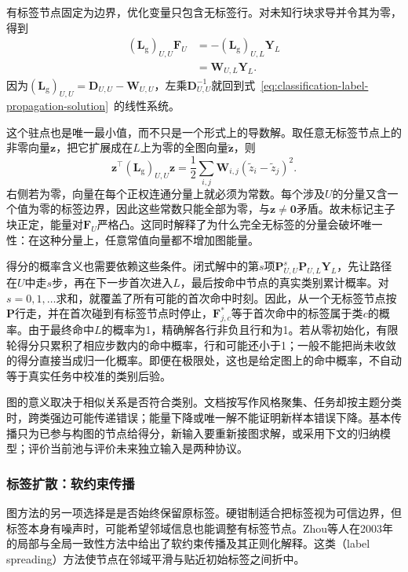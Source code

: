 有标签节点固定为边界，优化变量只包含无标签行。对未知行块求导并令其为零，得到
\begin{equation}
  \label{eq:classification-label-propagation-dirichlet}
  \begin{aligned}
    (\bm{L}_{\mathrm{g}})_{U,U}\bm{F}_U
      &=-(\bm{L}_{\mathrm{g}})_{U,L}\bm{Y}_L\\
      &=\bm{W}_{U,L}\bm{Y}_L.
  \end{aligned}
\end{equation}
因为$(\bm{L}_{\mathrm{g}})_{U,U}=\bm{D}_{U,U}-\bm{W}_{U,U}$，左乘$\bm{D}_{U,U}^{-1}$就回到式~\eqref{eq:classification-label-propagation-solution}~的线性系统。

这个驻点也是唯一最小值，而不只是一个形式上的导数解。取任意无标签节点上的非零向量$\bm{z}$，把它扩展成在$L$上为零的全图向量$\widetilde{\bm{z}}$，则
\[
  \bm{z}^{\top}(\bm{L}_{\mathrm{g}})_{U,U}\bm{z}
    =\frac12\sum_{i,j}\bm{W}_{i,j}
      (\widetilde z_i-\widetilde z_j)^2.
\]
右侧若为零，向量在每个正权连通分量上就必须为常数。每个涉及$U$的分量又含一个值为零的标签边界，因此这些常数只能全部为零，与$\bm{z}\ne\bm{0}$矛盾。故未标记主子块正定，能量对$\bm{F}_U$严格凸。这同时解释了为什么完全无标签的分量会破坏唯一性：在这种分量上，任意常值向量都不增加图能量。

得分的概率含义也需要依赖这些条件。闭式解中的第$s$项$\bm P_{U,U}^{s}\bm P_{U,L}\bm Y_L$，先让路径在$U$中走$s$步，再在下一步首次进入$L$，最后按命中节点的真实类别累计概率。对$s=0,1,\ldots$求和，就覆盖了所有可能的首次命中时刻。因此，从一个无标签节点按$\bm{P}$行走，并在首次碰到有标签节点时停止，$\bm{F}_{j,c}^\ast$等于首次命中的标签属于类$c$的概率。由于最终命中$L$的概率为1，精确解各行非负且行和为1。若从零初始化，有限轮得分只累积了相应步数内的命中概率，行和可能还小于1；一般不能把尚未收敛的得分直接当成归一化概率。即便在极限处，这也是给定图上的命中概率，不自动等于真实任务中校准的类别后验。

图的意义取决于相似关系是否符合类别。文档按写作风格聚集、任务却按主题分类时，跨类强边可能传递错误；能量下降或唯一解不能证明新样本错误下降。基本传播只为已参与构图的节点给得分，新输入要重新接图求解，或采用下文的归纳模型；评价当前池与评价未来独立输入是两种协议。

\subsubsection{标签扩散：软约束传播}

图方法的另一项选择是是否始终保留原标签。硬钳制适合把标签视为可信边界，但标签本身有噪声时，可能希望邻域信息也能调整有标签节点。Zhou等人在2003年的局部与全局一致性方法中给出了软约束传播及其正则化解释。这类（label spreading）方法使节点在邻域平滑与贴近初始标签之间折中。

